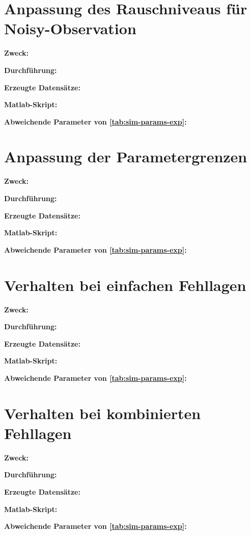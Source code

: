 \section{Anpassung des Rauschniveaus für Noisy-Observation}\label{sec:exp3}

\textbf{Zweck:}

\textbf{Durchführung:}

\textbf{Erzeugte Datensätze:}

\textbf{Matlab-Skript:}

\textbf{Abweichende Parameter von \autoref{tab:sim-params-exp}:}

\section{Anpassung der Parametergrenzen}\label{sec:exp4}

\textbf{Zweck:}

\textbf{Durchführung:}

\textbf{Erzeugte Datensätze:}

\textbf{Matlab-Skript:}

\textbf{Abweichende Parameter von \autoref{tab:sim-params-exp}:}

\section{Verhalten bei einfachen Fehllagen}\label{sec:exp5}

\textbf{Zweck:}

\textbf{Durchführung:}

\textbf{Erzeugte Datensätze:}

\textbf{Matlab-Skript:}

\textbf{Abweichende Parameter von \autoref{tab:sim-params-exp}:}

\section{Verhalten bei kombinierten Fehllagen}\label{sec:exp6}
	
\textbf{Zweck:}

\textbf{Durchführung:}

\textbf{Erzeugte Datensätze:}

\textbf{Matlab-Skript:}

\textbf{Abweichende Parameter von \autoref{tab:sim-params-exp}:}


